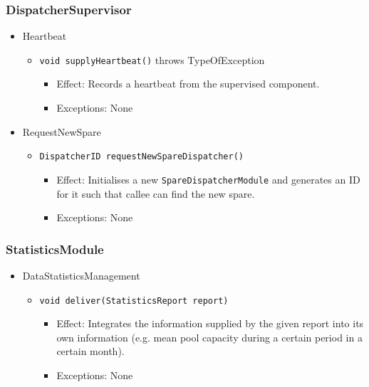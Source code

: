 \documentclass[a4paper,10pt]{article}
\begin{document}
\subsubsection*{DispatcherSupervisor}
\begin{itemize}
	\item Heartbeat
	\begin{itemize}
		\item \texttt{void supplyHeartbeat()} throws TypeOfException
		\begin{itemize}
			\item Effect: Records a heartbeat from the supervised component.
			\item Exceptions: None
		\end{itemize}
	\end{itemize}
\end{itemize}

\begin{itemize}
	\item RequestNewSpare
	\begin{itemize}
		\item \texttt{DispatcherID requestNewSpareDispatcher()}
		\begin{itemize}
			\item Effect: Initialises a new \texttt{SpareDispatcherModule} and generates an ID for it such that callee can find the new spare.
			\item Exceptions: None
		\end{itemize}
	\end{itemize}
\end{itemize}

\subsubsection*{StatisticsModule}
\begin{itemize}
	\item DataStatisticsManagement
	\begin{itemize}
		\item \texttt{void deliver(StatisticsReport report)}
		\begin{itemize}
			\item Effect: Integrates the information supplied by the given report into its own information (e.g. mean pool capacity during a certain period in a certain month).
			\item Exceptions: None
		\end{itemize}
	\end{itemize}
\end{itemize}
\end{document}
